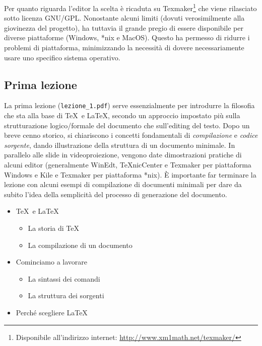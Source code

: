 \documentclass[a4paper,12pt]{article}
\begin{document}
Per quanto riguarda l'editor la scelta \`e ricaduta su
\textsf{Texmaker}\footnote{Disponibile all'indirizzo internet:
\url{http://www.xm1math.net/texmaker/}} che viene rilasciato sotto
licenza GNU/GPL. Nonostante alcuni limiti (dovuti verosimilmente alla
giovinezza del progetto), ha tuttavia il grande pregio di essere
disponibile per diverse piattaforme (Windows, *nix e MacOS). Questo
ha permesso di ridurre i problemi di piattaforma, minimizzando la
necessit\`a di dovere necessariamente usare uno specifico sistema
operativo. 

\subsection{Prima lezione}
La prima lezione (\texttt{lezione\_1.pdf}) serve essenzialmente per
introdurre la filosofia che sta alla base di \TeX\ e \LaTeX, secondo
un approccio impostato pi\`u sulla strutturazione logico/formale del
documento che sull'editing del testo. Dopo un breve cenno storico, si
chiariscono i concetti fondamentali di \emph{compilazione} e
\emph{codice sorgente}, dando illustrazione della struttura di un
documento minimale. In parallelo alle slide in videoproiezione,
vengono date dimostrazioni pratiche di alcuni editor (generalmente
\textsf{WinEdt}, \textsf{TeXnicCenter} e \textsf{Texmaker} per
piattaforma Windows e \textsf{Kile} e \textsf{Texmaker} per
piattaforma *nix). \`E importante far terminare la lezione con alcuni
esempi di compilazione di documenti minimali per dare da subito l'idea
della semplicit\`a del processo di generazione del documento.
	\begin{itemize}
	\item \TeX\ e \LaTeX
		\begin{itemize}
		\item La storia di \TeX\ 
		\item La compilazione di un documento
		\end{itemize}
	\item Cominciamo a lavorare
		\begin{itemize}
		\item La sintassi dei comandi
		\item La struttura dei sorgenti
		\end{itemize}
	\item Perch\'e scegliere \LaTeX
	\end{itemize}
\end{document}
